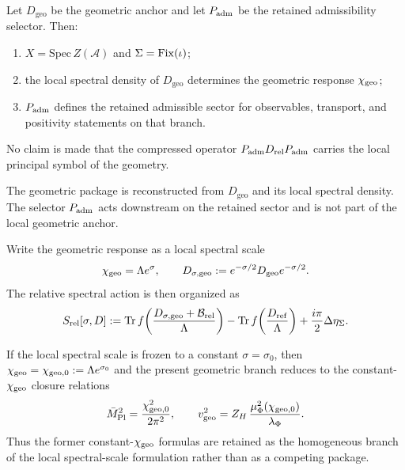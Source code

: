 \begin{theorem}
\label{thm:retained-branch-from-Padm}
\label{thm:admissible-sector-on-reconstructed-geometry}
\label{thm:full-operator-reconstruction}
Let $D_{\mathrm{geo}}$ be the geometric anchor and let $P_{\mathrm{adm}}$ be the retained
admissibility selector.
Then:
\begin{enumerate}[label=(\roman*), leftmargin=1.5em, topsep=3pt, itemsep=2pt]
\item $X=\mathrm{Spec}\,Z(\mathcal A)$ and $\Sigma=\mathrm{Fix}(\iota)$;
\item the local spectral density of $D_{\mathrm{geo}}$ determines the geometric response
      $\chi_{\mathrm{geo}}$;
\item $P_{\mathrm{adm}}$ defines the retained admissible sector for observables, transport,
      and positivity statements on that branch.
\end{enumerate}
No claim is made that the compressed operator $P_{\mathrm{adm}} D_{\mathrm{rel}}P_{\mathrm{adm}}$
carries the local principal symbol of the geometry.
\end{theorem}

\begin{corollary}
The geometric package is reconstructed from $D_{\mathrm{geo}}$ and its local spectral density.
The selector $P_{\mathrm{adm}}$ acts downstream on the retained sector and is not part of the
local geometric anchor.
\end{corollary}

\begin{definition}
\label{def:local-spectral-scale}
Write the geometric response as a local spectral scale
\[
\chi_{\mathrm{geo}}=\Lambda e^\sigma,
\qquad
D_{\sigma,\mathrm{geo}}:=e^{-\sigma/2}D_{\mathrm{geo}}e^{-\sigma/2}.
\]
The relative spectral action is then organized as
\[
S_{\mathrm{rel}}[\sigma,D]
:=
\operatorname{Tr} f\!\left(\frac{D_{\sigma,\mathrm{geo}}+\mathcal B_{\mathrm{rel}}}{\Lambda}\right)
-\operatorname{Tr} f\!\left(\frac{D_{\mathrm{ref}}}{\Lambda}\right)
+\frac{i\pi}{2}\Delta\eta_\Sigma.
\]
\end{definition}

\begin{corollary}
\label{cor:constant-scale-reduction}
If the local spectral scale is frozen to a constant $\sigma=\sigma_0$, then $\chi_{\mathrm{geo}}=\chi_{\mathrm{geo},0}:=\Lambda e^{\sigma_0}$ and the present geometric branch reduces to the constant-$\chi_{\mathrm{geo}}$ closure relations
\[
\bar M_{\mathrm{Pl}}^2=\frac{\chi_{\mathrm{geo},0}^2}{2\pi^2},
\qquad
v_{\mathrm{geo}}^2=Z_H\,\frac{\mu_\Phi^2(\chi_{\mathrm{geo},0})}{\lambda_\Phi}.
\]
Thus the former constant-$\chi_{\mathrm{geo}}$ formulas are retained as the homogeneous branch of the local spectral-scale formulation rather than as a competing package.
\end{corollary}


